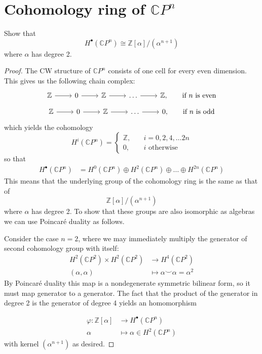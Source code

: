 \section{Cohomology ring of $\mathbb{C} P^n$}
	\begin{exercise}
	Show that
	\[H^\bullet(\mathbb{C} P^n)\cong \mathbb{Z}[\alpha]/(\alpha^{n+1})\]
	where $\alpha$ has degree 2.
\end{exercise}
\begin{proof}
	The CW structure of $\mathbb{C} P^n$ consists of one cell for every even dimension. This gives us the following chain complex:
	\[\begin{tikzcd}
		\mathbb{Z}\arrow[r]&0\arrow[r]&\mathbb{Z}\arrow[r]&\ldots\arrow[r]&\mathbb{Z},\qquad\text{if }n\text{ is even}
	\end{tikzcd}\]
	\[\begin{tikzcd}
		\mathbb{Z}\arrow[r]&0\arrow[r]&\mathbb{Z}\arrow[r]&\ldots\arrow[r]&0,\qquad\text{if }n\text{ is odd}
	\end{tikzcd}\]
	which yields the cohomology
	\[H^i(\mathbb{C} P^n)=\begin{cases}
		\mathbb{Z},\quad&i=0,2,4,\ldots 2n\\
		0,\quad&i\text{ otherwise}
	\end{cases}\]
	so that
	\begin{align*}
		H^\bullet(\mathbb{C} P^n)&=H^0(\mathbb{C} P^n)\oplus H^2(\mathbb{C} P^n)\oplus\ldots\oplus H^{2n}(\mathbb{C} P^{n})
	\end{align*}
	This means that the underlying group of the cohomology ring is the same as that of
	\[\mathbb{Z}[\alpha]/(\alpha^{n+1})\]
	where $\alpha$ has degree 2. To show that these groups are also isomorphic as algebras we can use Poincar\'e duality as follows.
	
	Consider the case $n=2$, where we may immediately multiply the generator of second cohomology group with itself:
	\begin{align*}
		H^2(\mathbb{C} P^2)\times H^2(\mathbb{C} P^2)&\to H^4(\mathbb{C} P^2)\\
		(\alpha,\alpha)\qquad\quad&\mapsto\alpha\smile\alpha =\alpha^2
	\end{align*}
	By Poincar\'e duality this map is a nondegenerate symmetric bilinear form, so it must map generator to a generator. {\color{blue-violet}The fact that the product of the generator in degree 2 is the generator of degree 4} yields an homomorphism

	\begin{align*}
		\varphi:\mathbb{Z}[\alpha]&\to H^\bullet(\mathbb{C} P^n)\\
		\alpha&\mapsto\alpha\in H^2(\mathbb{C} P^n)
	\end{align*}
	with kernel $(\alpha^{n+1})$ as desired.
	

\end{proof}
